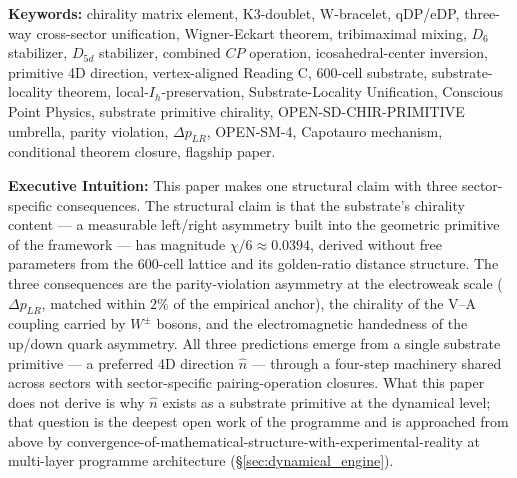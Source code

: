 \documentclass[11pt,letterpaper]{article}
\newcommand{\DeltapLR}{\Delta p_{LR}}
\newcommand{\Dsix}{D_6}
\begin{document}
\begin{abstract}
The paper makes explicit as out of scope at v2.0: observable manifestations (iv) thermodynamic causal arrow and (v) cosmological-vacuum asymmetry of the OPEN-SD-CHIR-PRIMITIVE umbrella (future-window work); the Capotauro nucleation event (OPEN-SM-4 sub-claim (a) and Q7 cosmological-timing sub-questions of the Reading C closure trajectory); the first-principles derivation of $\hat{n}$ itself from CPP primitive axioms (Q1$'$+Q1$'$.A Layer 3 promotion; future-window dynamical/causal/energetic derivation); the PMNS reactor mixing angle $\sin^2\theta_{13}$ (re-scoped to SF-2 v2.0+ flagship per v1.0); the CP-violating phase $\delta_{CP}$ and the baryon asymmetry $\eta_B$ (downstream sub-claim work); sector-specific Layer 4 continuum-EFT kinematic projections of the substrate handle $\chi/6$ to observable scales (SF-2 V--A coupling at the massless helicity limit; SM-2 chiral-polarity-bias EFT continuum-limit calculation). The paper's conditional-theorem-closure framework registers two new Reading C foundational inputs --- FI-C-RC-1 (primitive 4D direction $\hat{n}$) and FI-C-RC-2 (vertex-aligned reading $\hat{n} = v_{\text{host}}$ at Layer 2 via three converging arguments) --- in addition to the ten foundational inputs of v1.0 (FI-C-1 through FI-C-10).
\end{abstract}

\medskip\noindent
\textbf{Keywords:} chirality matrix element, K3-doublet, W-bracelet, qDP/eDP, three-way cross-sector unification, Wigner-Eckart theorem, tribimaximal mixing, $\Dsix$ stabilizer, $D_{5d}$ stabilizer, combined $CP$ operation, icosahedral-center inversion, primitive 4D direction, vertex-aligned Reading C, 600-cell substrate, substrate-locality theorem, local-$I_h$-preservation, Substrate-Locality Unification, Conscious Point Physics, substrate primitive chirality, OPEN-SD-CHIR-PRIMITIVE umbrella, parity violation, $\Delta p_{LR}$, OPEN-SM-4, Capotauro mechanism, conditional theorem closure, flagship paper.

\bigskip\noindent
\textbf{Executive Intuition:}
This paper makes one structural claim with three sector-specific consequences. The structural claim is that the substrate's chirality content --- a measurable left/right asymmetry built into the geometric primitive of the framework --- has magnitude $\chi/6 \approx 0.0394$, derived without free parameters from the 600-cell lattice and its golden-ratio distance structure. The three consequences are the parity-violation asymmetry at the electroweak scale ($\DeltapLR$, matched within $2\%$ of the empirical anchor), the chirality of the V--A coupling carried by $W^\pm$ bosons, and the electromagnetic handedness of the up/down quark asymmetry. All three predictions emerge from a single substrate primitive --- a preferred 4D direction $\hat{n}$ --- through a four-step machinery shared across sectors with sector-specific pairing-operation closures. What this paper does not derive is why $\hat{n}$ exists as a substrate primitive at the dynamical level; that question is the deepest open work of the programme and is approached from above by convergence-of-mathematical-structure-with-experimental-reality at multi-layer programme architecture (\S\ref{sec:dynamical_engine}).
\end{document}
